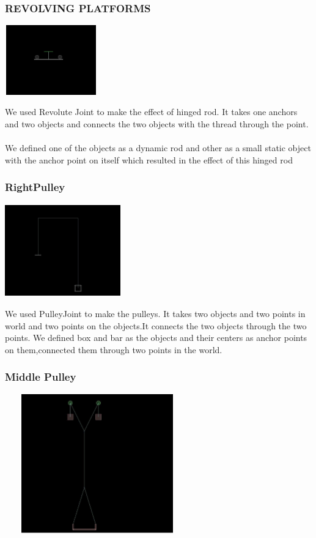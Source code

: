 \documentclass[t,compress,11pt,xcolor=dvipsnames]{beamer}
\begin{document}
\begin{frame}
\frametitle{REVOLVING PLATFORMS }
\begin{center}
\includegraphics[width=4cm,height=3cm]{revolvingplatform}
\end{center}
We used Revolute Joint to make the effect of hinged rod.
It takes one anchors and two objects and connects the two objects with
the thread through the point.\\~\\
We defined one of the objects as a dynamic rod and other as a small
static object with the anchor point on itself which resulted in the effect
of this hinged rod
\end{frame}
\begin{frame}
\frametitle{RightPulley}
\begin{center}
\includegraphics[width=5cm,height=4cm]{pulley}
\end{center}
We used PulleyJoint to make the pulleys.
It takes two objects and two points in world and two points on the objects.It connects the two objects through the two points.
We defined box and bar as the objects and their centers as anchor points on them,connected them through two points in the world. 
\end{frame}
\begin{frame}
\frametitle{Middle Pulley}
\begin{center}
\includegraphics[width=8cm,height=6cm]{middlepulley}
\end{center}
\end{frame}
\end{document}
